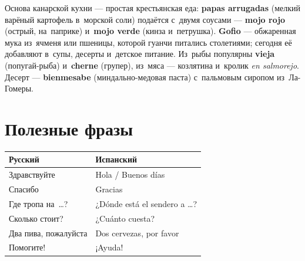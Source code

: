 Основа канарской кухни --- простая крестьянская еда:
\textbf{papas arrugadas} (мелкий варёный картофель в~морской соли)
подаётся с~двумя соусами --- \textbf{mojo rojo} (острый, на~паприке)
и~\textbf{mojo verde} (кинза и~петрушка).
\textbf{Gofio} --- обжаренная мука из~ячменя или пшеницы, которой
гуанчи питались столетиями; сегодня её добавляют в~супы, десерты
и~детское питание.
Из~рыбы популярны \textbf{vieja} (попугай-рыба) и~\textbf{cherne}
(групер), из~мяса --- козлятина и~кролик \textit{en salmorejo}.
Десерт --- \textbf{bienmesabe} (миндально-медовая паста)
с~пальмовым сиропом из~Ла-Гомеры.

\section{Полезные фразы}

\begin{center}\small
\begin{tabular}{ll}
\toprule
Русский & Испанский \\
\midrule
Здравствуйте            & Hola / Buenos días \\
Спасибо                 & Gracias \\
Где тропа на~\ldots?    & ¿Dónde está el sendero a \ldots? \\
Сколько стоит?          & ¿Cuánto cuesta? \\
Два пива, пожалуйста    & Dos cervezas, por favor \\
Помогите!               & ¡Ayuda! \\
\bottomrule
\end{tabular}
\end{center}
